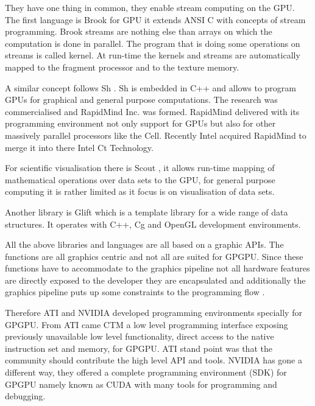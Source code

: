 They have one thing in common, they enable stream computing on the \gls{GPU}. The
first language is Brook\citep{Buck:2004} for \gls{GPU} it extends \gls{ANSI} C
with concepts of stream programming. Brook streams are nothing else than arrays
on which the computation is done in parallel. The program that is doing some
operations on streams is called kernel. At run-time the kernels and streams are
automatically mapped to the fragment processor and to the texture memory. 

A similar concept follows Sh \citep{citeulike:6661860}. Sh is embedded in C++ 
and allows to program \glspl{GPU} for graphical and general purpose computations. 
The research was commercialised and RapidMind Inc. was formed. RapidMind delivered
with its programming environment not only support for \glspl{GPU} but also for
other massively parallel processors like the Cell. Recently Intel acquired RapidMind
to merge it into there Intel Ct Technology. 

For scientific visualisation there is Scout \citep{citeulike:3145428},
it allows run-time mapping  of mathematical operations over data sets to the 
\gls{GPU}, for general purpose computing it is rather limited as it focus is on
visualisation of data sets. 

Another library is Glift \citep{Lefohn:2006:GGE} which is a template library 
for a wide range of data structures. It operates with C++, Cg and OpenGL 
development environments. 

All the above libraries and languages are all based on a graphic \glspl{API}.
The functions are all graphics centric and not all are suited for \gls{GPGPU}.
Since these functions have to accommodate to the graphics pipeline not all
hardware features are directly exposed to the developer they are encapsulated
and additionally the graphics pipeline puts up some constraints to the
programming flow \citep{citeulike:1187394}.

Therefore \gls{ATI} and \gls{NVIDIA} developed programming environments
specially for \gls{GPGPU}. From \gls{ATI} came \gls{CTM} a low level programming
interface exposing previously unavailable low level functionality, direct
access to the native instruction set and memory, for \gls{GPGPU}. \Gls{ATI}
stand point was that the community should contribute the high level \gls{API}
and tools. \Gls{NVIDIA} has gone a different way, they offered a complete
programming environment (\gls{SDK}) for \gls{GPGPU} namely known as \gls{CUDA}
\citep{citeulike:3839013} with many tools for programming and debugging. 

